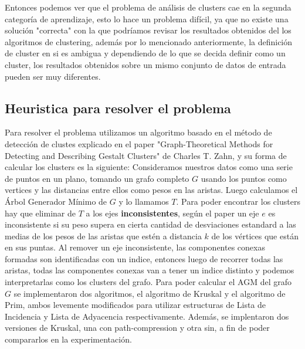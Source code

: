 \documentclass[11pt,a4paper]{article}
\begin{document}
Entonces podemos ver que el problema de análisis de clusters cae en la segunda categoría de aprendizaje, esto lo hace un problema difícil, ya que no existe una solución "correcta" con la que podríamos revisar los resultados obtenidos del los algoritmos de clustering, además por lo mencionado anteriormente, la definición de cluster en si es ambigua y dependiendo de lo que se decida definir como un cluster, los resultados obtenidos sobre un mismo conjunto de datos de entrada pueden ser muy diferentes.




\subsection{Heuristica para resolver el problema}

Para resolver el problema utilizamos un algoritmo basado en el método de detección de clustes explicado en el paper "Graph-Theoretical Methods for Detecting and Describing Gestalt Clusters" de Charles T. Zahn, y su forma de calcular los clusters es la siguiente: Consideramos nuestros datos como una serie de puntos en un plano, tomando un grafo completo $G$ usando los puntos como vertices y las distancias entre ellos como pesos en las aristas. Luego calculamos el Árbol Generador Mínimo de $G$ y lo llamamos $T$.
Para poder encontrar los clusters hay que eliminar de $T$ a los ejes \textbf{inconsistentes}, según el paper un eje $e$ es inconsistente si su peso supera en cierta cantidad de desviaciones estandard a las medias de los pesos de las aristas que estén a distancia $k$ de los vértices que están en sus puntas. Al remover un eje inconsistente, las componentes conexas formadas son identificadas con un indice, entonces luego de recorrer todas las aristas, todas las componentes conexas van a tener un  indice distinto y podemos interpretarlas como los clusters del grafo.
Para poder calcular el AGM del grafo $G$ se implementaron dos algoritmos, el algoritmo de Kruskal y el algoritmo de Prim, ambos levemente modificados para utilizar estructuras de Lista de Incidencia y Lista de Adyacencia respectivamente. Además, se implentaron dos versiones de Kruskal, una con path-compression y otra sin, a fin de poder compararlos en la experimentación.
\end{document}
